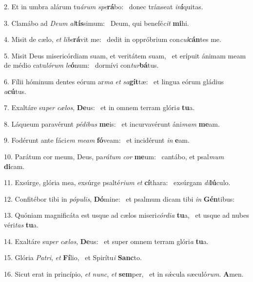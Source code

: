 2. Et in umbra alárum tu\textit{á}\textit{rum} \textit{spe}\textbf{rá}bo: \ast\  donec tránseat \textit{in}\textbf{í}quitas.\

3. Clamábo ad \textit{De}\textit{um} \textit{al}\textbf{tís}simum: \ast\  Deum, qui benefé\textit{cit} \textbf{mi}hi.\

4. Misit de cælo, \textit{et} \textit{li}\textit{be}\textbf{rá}vit me: \ast\  dedit in oppróbrium con\textit{cul}\textbf{cán}tes me.\

5. Misit Deus misericórdiam suam, et veritátem suam, \dag\  et erípuit ánimam meam de médio catu\textit{ló}\textit{rum} \textit{le}\textbf{ó}num: \ast\  dormívi con\textit{tur}\textbf{bá}tus.\

6. Fílii hóminum dentes eórum ar\textit{ma} \textit{et} \textit{sa}\textbf{gít}tæ: \ast\  et lingua eórum gládius \textit{a}\textbf{cú}tus.\

7. Exaltáre su\textit{per} \textit{cæ}\textit{los}, \textbf{De}us: \ast\  et in omnem terram glóri\textit{a} \textbf{tu}a.\

8. Láqueum paravérunt \textit{pé}\textit{di}\textit{bus} \textbf{me}is: \ast\  et incurvavérunt áni\textit{mam} \textbf{me}am.\

9. Fodérunt ante fáci\textit{em} \textit{me}\textit{am} \textbf{fó}veam: \ast\  et incidérunt \textit{in} \textbf{e}am.\

10. Parátum cor meum, Deus, pa\textit{rá}\textit{tum} \textit{cor} \textbf{me}um: \ast\  cantábo, et psal\textit{mum} \textbf{di}cam.\

11. Exsúrge, glória mea, exsúrge psalté\textit{ri}\textit{um} \textit{et} \textbf{cí}thara: \ast\  exsúrgam \textit{di}\textbf{lú}culo.\

12. Confitébor tibi in \textit{pó}\textit{pu}\textit{lis}, \textbf{Dó}mine: \ast\  et psalmum dicam tibi \textit{in} \textbf{Gén}tibus:\

13. Quóniam magnificáta est usque ad cælos miseri\textit{cór}\textit{di}\textit{a} \textbf{tu}a, \ast\  et usque ad nubes véri\textit{tas} \textbf{tu}a.\

14. Exaltáre su\textit{per} \textit{cæ}\textit{los}, \textbf{De}us: \ast\  et super omnem terram glóri\textit{a} \textbf{tu}a.\

15. Glória \textit{Pa}\textit{tri}, \textit{et} \textbf{Fí}lio, \ast\  et Spirítu\textit{i} \textbf{Sanc}to.\

16. Sicut erat in princípio, \textit{et} \textit{nunc}, \textit{et} \textbf{sem}per, \ast\  et in sǽcula sæculó\textit{rum}. \textbf{A}men.\

